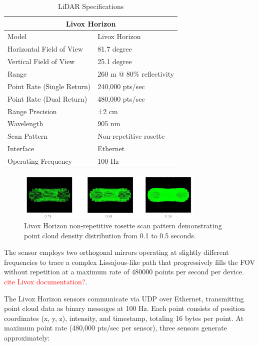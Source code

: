 \begin{table}[htpb]
\centering
\caption{LiDAR Specifications}
\begin{tabular}{ll}
\hline
\multicolumn{2}{c}{Livox Horizon}\\
\hline
\hline
Model & Livox Horizon \\
Horizontal Field of View & 81.7 degree \\
Vertical Field of View & 25.1 degree \\
Range & 260 m @ 80\% reflectivity \\
Point Rate (Single Return) & 240,000 pts/sec \\
Point Rate (Dual Return) & 480,000 pts/sec \\
Range Precision & ±2 cm \\
Wavelength & 905 nm \\
Scan Pattern & Non-repetitive rosette \\
Interface & Ethernet \\
Operating Frequency & 100 Hz \\
\hline
\end{tabular}
\label{tab:livox_horizon_specs}
\end{table}

\begin{figure}[htbp]
\centering
\includegraphics[width=0.8\textwidth]{Images/Livox_1.png}
\caption{Livox Horizon non-repetitive rosette scan pattern demonstrating point cloud density distribution from 0.1 to 0.5 seconds.}
\label{fig:livox_scan_pattern}
\end{figure}

The sensor employs two orthogonal mirrors operating at slightly different frequencies to trace a complex Lissajous-like path that progressively fills the \ac{FOV} without repetition at a maximum rate of $480000$ points per second per device.
\textcolor{red}{cite Livox documentation?}.

The Livox Horizon sensors communicate via \ac{UDP} over Ethernet, transmitting point cloud data as binary messages at 100 Hz.
Each point consists of position coordinates (x, y, z), intensity, and timestamp, totaling 16 bytes per point.
At maximum point rate (480,000 pts/sec per sensor), three sensors generate approximately:

